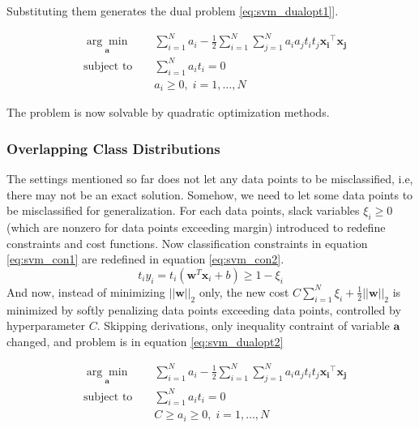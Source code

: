 Substituting them generates the dual problem \ref{eq:svm_dualopt1}].

\begin{equation}
\label{eq:svm_dualopt1}
\begin{aligned}
&\underset{\boldsymbol{a}}{\arg\min}&& \sum_{i=1}^{N} a_i - \frac{1}{2}\sum_{i=1}^{N}\sum_{j=1}^{N} a_i a_j t_i t_j \boldsymbol{x_i}^\intercal \boldsymbol{x_j}\\
&\text{subject to } &&\sum_{i=1}^{N} a_i t_i = 0 \\
& && a_i \geq 0, \; i=1,\ldots,N
\end{aligned}
\end{equation} 

The problem is now solvable by quadratic optimization methods.

\subsubsection{Overlapping Class Distributions}
The settings mentioned so far does not let any data points to be misclassified, i.e, there may not be an exact solution. Somehow, we need to let some data points to be misclassified for generalization.
For each data points, slack variables $\xi_i \geq 0$ (which are nonzero for data points exceeding margin) introduced to redefine constraints and cost functions.
Now classification constraints in equation \ref{eq:svm_con1} are redefined in equation \ref{eq:svm_con2}.
\begin{equation}
\label{eq:svm_con2}
t_i y_i = t_i (\boldsymbol{w}^T \boldsymbol{x}_i + b) \geq 1-\xi_i
\end{equation} 
And now, instead of minimizing $||\boldsymbol{w}||_2$ only, the new cost $C\sum_{i=1}^{N} \xi_i + \frac{1}{2}||\boldsymbol{w}||_2$ is minimized by softly penalizing data points exceeding data points, controlled by hyperparameter $C$.
Skipping derivations, only inequality contraint of variable $\boldsymbol{a}$ changed, and problem is in equation \ref{eq:svm_dualopt2} 

\begin{equation}
\label{eq:svm_dualopt2}
\begin{aligned}
&\underset{\boldsymbol{a}}{\arg\min}&& \sum_{i=1}^{N} a_i - \frac{1}{2}\sum_{i=1}^{N}\sum_{j=1}^{N} a_i a_j t_i t_j \boldsymbol{x_i}^\intercal \boldsymbol{x_j}\\
&\text{subject to } &&\sum_{i=1}^{N} a_i t_i = 0 \\
& && C \geq a_i \geq 0, \; i=1,\ldots,N
\end{aligned}
\end{equation} 


